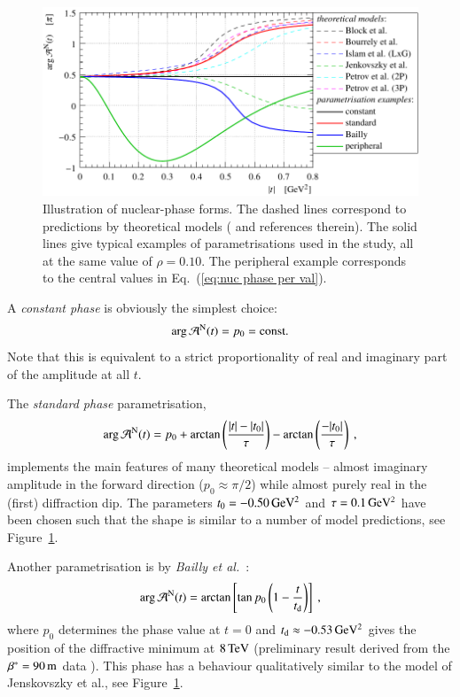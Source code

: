 \begin{figure}
\begin{center}
\includegraphics{fig/hadronic_phase_illustration.pdf}
\caption{Illustration of nuclear-phase forms. The dashed lines correspond to predictions by theoretical models (\cite{elegent} and references therein). The solid lines give typical examples of parametrisations used in the study, all at the same value of $\rho = 0.10$. The peripheral example corresponds to the central values in Eq.~(\ref{eq:nuc phase per val}).
}
\label{fig:phase illustration}
\end{center}
\end{figure}


A {\it constant phase} is obviously the simplest choice:
\begin{equation}
\label{eq:nuc phase con}
\arg {\cal A}^{\rm N}(t) = p_0 = \hbox{const.}
\end{equation}
Note that this is equivalent to a strict proportionality of real and imaginary part of the amplitude at all $t$.

The {\it standard phase} parametrisation,
\begin{equation}
\label{eqn:nuc phase std}
\arg {\cal A}^{\rm N}(t) = p_{0} + \arctan \left(\frac{|t|-|t_{0}|}{\tau}\right) -  \arctan \left(\frac{-|t_{0}|}{\tau}\right) \: ,
\end{equation}
implements the main features of many theoretical models -- almost imaginary amplitude in the forward direction ($p_0 \approx \pi/2$) while almost purely real in the (first) diffraction dip. The parameters $t_0 = - 0.50\,{\rm GeV^2}$ and $\tau = 0.1\,{\rm GeV^2}$ have been chosen such that the shape is similar to a number of model predictions, see Figure~\ref{fig:phase illustration}.

Another parametrisation is by {\em Bailly et al.}~\cite{bailly87}:
\begin{equation}
\label{eq:nuc phase bai}
	\arg {\cal A}^{\rm N}(t) = \arctan \left[ \tan p_0 \left(1 - {t\over t_{\rm d}} \right) \right]\ ,
\end{equation}
where $p_0$ determines the phase value at $t=0$ and $t_{\rm d} \approx -0.53\,{\rm GeV^2}$ gives the position of the diffractive minimum at $8\,{\rm TeV}$ (preliminary result derived from the $\beta^* = 90\,{\rm m}$ data \cite{8tev-90m}). This phase has a behaviour qualitatively similar to the model of Jenskovszky et al., see Figure~\ref{fig:phase illustration}.

